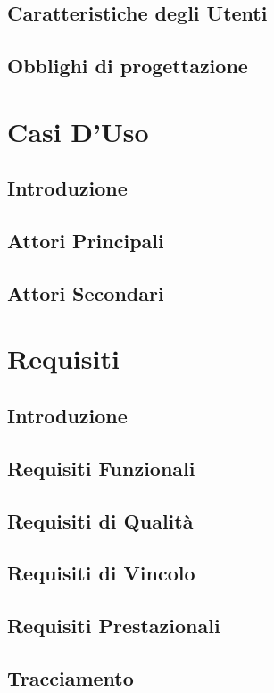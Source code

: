 \documentclass[12pt]{article}
\begin{document}
\subsection{Caratteristiche degli Utenti}
\subsection{Obblighi di progettazione}

\section{Casi D'Uso}
\subsection{Introduzione}
\subsection{Attori Principali}
\subsection{Attori Secondari}

\section{Requisiti}
\subsection{Introduzione}
\subsection{Requisiti Funzionali}
\subsection{Requisiti di Qualità}
\subsection{Requisiti di Vincolo}
\subsection{Requisiti Prestazionali}
\subsection{Tracciamento}

\listoffigures

\listoftables
\end{document}
